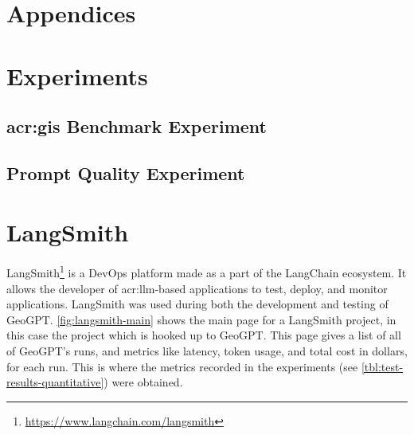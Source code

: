 \begin{appendix}
    \chapter*{Appendices}
    \label{cha:appendices}




    \chapter{Experiments}
    \label{app:experiments}

    \section[GIS Benchmark Experiment]{\acrshort{acr:gis} Benchmark Experiment}
    \label{appsec:questions-and-answer}

    
    \newpage
    

    \newpage

    \section{Prompt Quality Experiment}
    
    \newpage
    

    \chapter{LangSmith}

    LangSmith\footnote{\url{https://www.langchain.com/langsmith}} is a DevOps platform made as a part of the LangChain ecosystem. It allows the developer of \acrshort{acr:llm}-based applications to test, deploy, and monitor applications. LangSmith was used during both the development and testing of GeoGPT. \autoref{fig:langsmith-main} shows the main page for a LangSmith project, in this case the project which is hooked up to GeoGPT. This page gives a list of all of GeoGPT's runs, and metrics like latency, token usage, and total cost in dollars, for each run. This is where the metrics recorded in the experiments (see \autoref{tbl:test-results-quantitative}) were obtained.


\end{appendix}
